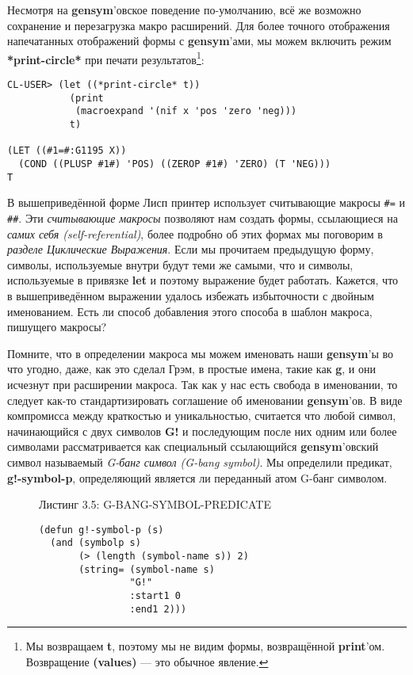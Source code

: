 Несмотря на \textbf{gensym}'овское поведение по-умолчанию, всё же возможно сохранение и перезагрузка макро расширений. Для более точного отображения напечатанных отображений формы с \textbf{gensym}'ами, мы можем включить режим \textbf{*print-circle*} при печати результатов\footnote{Мы возвращаем \textbf{t}, поэтому мы не видим формы, возвращённой \textbf{print}'ом. Возвращение \textbf{(values)} --- это обычное явление.}:

\begin{verbatim}
CL-USER> (let ((*print-circle* t))
           (print
            (macroexpand '(nif x 'pos 'zero 'neg)))
           t)

(LET ((#1=#:G1195 X))
  (COND ((PLUSP #1#) 'POS) ((ZEROP #1#) 'ZERO) (T 'NEG))) 
T
\end{verbatim}

В вышеприведённой форме Лисп принтер использует считывающие макросы \verb"#=" и \verb"##". Эти \emph{считывающие макросы} позволяют нам создать формы, ссылающиеся на \emph{самих себя (self-referential)}, более подробно об этих формах мы поговорим в \emph{разделе Циклические Выражения}. Если мы прочитаем предыдущую форму, символы, используемые внутри будут теми же самыми, что и символы, используемые в привязке \textbf{let} и поэтому выражение будет работать. Кажется, что в вышеприведённом выражении удалось избежать избыточности с двойным именованием. Есть ли способ добавления этого способа в шаблон макроса, пишущего макросы?

Помните, что в определении макроса мы можем именовать наши \textbf{gensym}'ы во что угодно, даже, как это сделал Грэм, в простые имена, такие как \textbf{g}, и они исчезнут при расширении макроса. Так как у нас есть свобода в именовании, то следует как-то стандартизировать соглашение об именовании \textbf{gensym}'ов. В виде компромисса между краткостью и уникальностью, считается что любой символ, начинающийся с двух символов \textbf{G!} и последующим после них одним или более символами рассматривается как специальный ссылающийся \textbf{gensym}'овский символ называемый \emph{G-банг символ (G-bang symbol)}. Мы определили предикат, \textbf{g!-symbol-p}, определяющий является ли переданный атом G-банг символом.

\begin{figure}Листинг 3.5: G-BANG-SYMBOL-PREDICATE\label{listing_3.5}
\listbegin
\begin{verbatim}
(defun g!-symbol-p (s)
  (and (symbolp s)
       (> (length (symbol-name s)) 2)
       (string= (symbol-name s)
                "G!"
                :start1 0
                :end1 2)))
\end{verbatim}
\listend
\end{figure}

